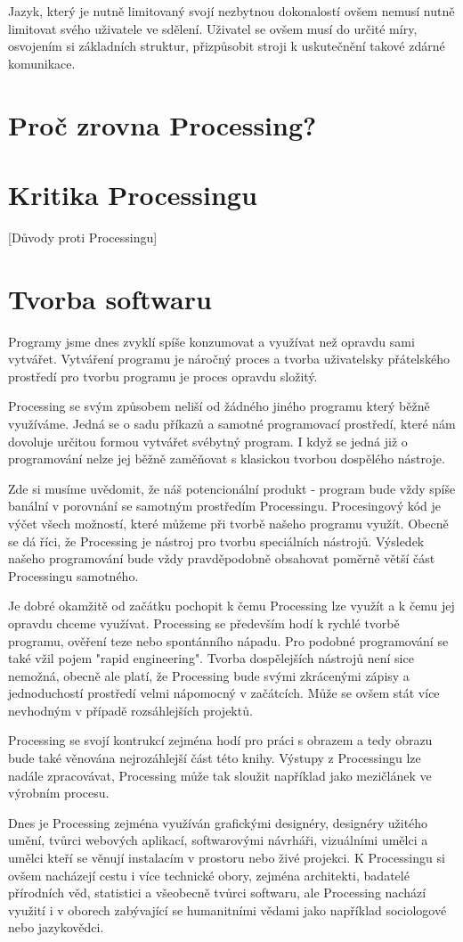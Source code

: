\documentclass[11pt]{book}
\newcommand{\oddil}[1]{\section{#1}\label{sec:#1}}
\begin{document}
Jazyk, který je nutně limitovaný svojí nezbytnou dokonalostí ovšem nemusí nutně limitovat svého uživatele ve sdělení. Uživatel se ovšem musí do určité míry, osvojením si základních struktur, přizpůsobit stroji k uskutečnění takové zdárné komunikace.


\oddil{Proč zrovna Processing?}

\oddil{Kritika Processingu}

[Důvody proti Processingu]

\oddil{Tvorba softwaru}

Programy jsme dnes zvyklí spíše konzumovat a využívat než opravdu sami vytvářet. Vytváření programu je náročný proces a tvorba uživatelsky přátelského prostředí pro tvorbu programu je proces opravdu složitý.

Processing se svým způsobem neliší od žádného jiného programu který běžně využíváme. Jedná se o sadu příkazů a samotné programovací prostředí, které nám dovoluje určitou formou vytvářet svébytný program. I když se jedná již o programování nelze jej běžně zaměňovat s klasickou tvorbou dospělého nástroje.

Zde si musíme uvědomit, že náš potencionální produkt - program bude vždy spíše banální v porovnání se samotným prostředím Processingu. Procesingový kód je výčet všech možností, které můžeme při tvorbě našeho programu využít. Obecně se dá říci, že Processing je nástroj pro tvorbu speciálních nástrojů. Výsledek našeho programování bude vždy pravděpodobně obsahovat poměrně větší část Processingu samotného.

Je dobré okamžitě od začátku pochopit k čemu Processing lze využít a k čemu jej opravdu chceme využívat. Processing se především hodí k rychlé tvorbě programu, ověření teze nebo spontánního nápadu. Pro podobné programování se také vžil pojem "rapid engineering". Tvorba dospělejších nástrojů není sice nemožná, obecně ale platí, že Processing bude svými zkrácenými zápisy a jednoduchostí prostředí velmi nápomocný v začátcích. Může se ovšem stát více nevhodným v případě rozsáhlejších projektů.

Processing se svojí kontrukcí zejména hodí pro práci s obrazem a tedy obrazu bude také věnována nejrozáhlejší část této knihy. Výstupy z Processingu lze nadále zpracovávat, Processing může tak sloužit například jako mezičlánek ve výrobním procesu.

Dnes je Processing zejména využíván grafickými designéry, designéry užitého umění, tvůrci webových aplikací, softwarovými návrháři, vizuálními umělci a umělci kteří se věnují instalacím v prostoru nebo živé projekci. K Processingu si ovšem nacházejí cestu i více technické obory, zejména architekti, badatelé přírodních věd, statistici a všeobecně tvůrci softwaru, ale Processing nachází využití i v oborech zabývající se humanitními vědami jako například sociologové nebo jazykovědci.
\end{document}
